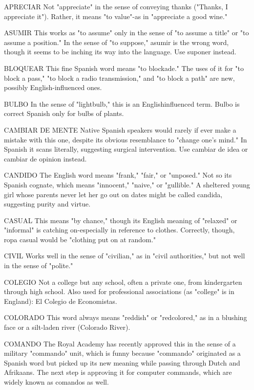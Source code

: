 APRECIAR Not "appreciate" in the sense of conveying
thanks ("Thanks, I appreciate it"). Rather, it means "to value"-as
in "appreciate a good wine."

ASUMIR This works as "to assume" only in the sense of "to
assume a title" or "to assume a position." In the sense of "to suppose,"
asumir is the wrong word, though it seems to be inching its way into
the language. Use suponer instead.

BLOQUEAR This fine Spanish word means "to blockade."
The uses of it for "to block a pass," "to block a radio transmission,"
and "to block a path" are new, possibly English-influenced ones.

BULBO In the sense of "lightbulb," this is an Englishinfluenced term. Bulbo is correct Spanish only for bulbs of plants.

CAMBIAR DE MENTE Native Spanish speakers would rarely if
ever make a mistake with this one, despite its obvious resemblance to
"change one's mind." In Spanish it scans literally, suggesting surgical
intervention. Use cambiar de idea or cambiar de opinion instead.

CANDIDO The English word means "frank," "fair," or "unposed." Not so its Spanish cognate, which means "innocent," "naive,"
or "gullible." A sheltered young girl whose parents never let her go out
on dates might be called candida, suggesting purity and virtue.

CASUAL This means "by chance," though its English meaning of "relaxed" or "informal" is catching on-especially in reference
to clothes. Correctly, though, ropa casual would be "clothing put on at
random."

CIVIL Works well in the sense of "civilian," as in "civil authorities," but not well in the sense of "polite."

COLEGIO Not a college but any school, often a private one,
from kindergarten through high school. Also used for professional associations (as "college" is in England): El Colegio de Economistas.

COLORADO This word always means "reddish" or "redcolored," as in a blushing face or a silt-laden river (Colorado River).

COMANDO The Royal Academy has recently approved this in
the sense of a military "commando" unit, which is funny because "commando" originated as a Spanish word but picked up its new meaning
while passing through Dutch and Afrikaans. The next step is approving it for computer commands, which are widely known as comandos
as well.

